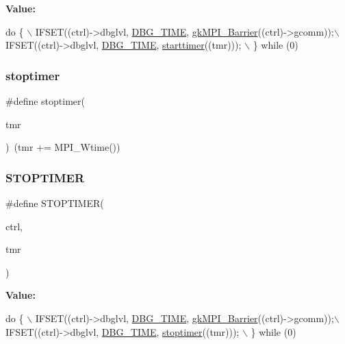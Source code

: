 {\bfseries Value\+:}
\begin{DoxyCode}
\textcolor{keywordflow}{do} \{ \(\backslash\)
     IFSET((ctrl)->dbglvl, \hyperlink{a00894_ae69476d7e520ec253b24dd0f2305dfbc}{DBG\_TIME}, \hyperlink{a00960_a2e3dc0708c9b1ba0aa67b8138b878d00}{gkMPI\_Barrier}((ctrl)->gcomm));\(\backslash\)
     IFSET((ctrl)->dbglvl, \hyperlink{a00894_ae69476d7e520ec253b24dd0f2305dfbc}{DBG\_TIME}, \hyperlink{a00924_ae152c218f682104fbe90b42318765caf}{starttimer}((tmr))); \(\backslash\)
   \} \textcolor{keywordflow}{while} (0)
\end{DoxyCode}
\mbox{\label{a00924_a5201dfe38edd7089e892384c62267802}} 
\subsubsection{\texorpdfstring{stoptimer}{stoptimer}}
{\footnotesize\ttfamily \#define stoptimer(\begin{DoxyParamCaption}\item[{}]{tmr }\end{DoxyParamCaption})~(tmr += M\+P\+I\+\_\+\+Wtime())}

\mbox{\label{a00924_ac283007da12d7cee4bc94d545f4700f5}} 
\subsubsection{\texorpdfstring{S\+T\+O\+P\+T\+I\+M\+ER}{STOPTIMER}}
{\footnotesize\ttfamily \#define S\+T\+O\+P\+T\+I\+M\+ER(\begin{DoxyParamCaption}\item[{}]{ctrl,  }\item[{}]{tmr }\end{DoxyParamCaption})}

{\bfseries Value\+:}
\begin{DoxyCode}
\textcolor{keywordflow}{do} \{ \(\backslash\)
     IFSET((ctrl)->dbglvl, \hyperlink{a00894_ae69476d7e520ec253b24dd0f2305dfbc}{DBG\_TIME}, \hyperlink{a00960_a2e3dc0708c9b1ba0aa67b8138b878d00}{gkMPI\_Barrier}((ctrl)->gcomm));\(\backslash\)
     IFSET((ctrl)->dbglvl, \hyperlink{a00894_ae69476d7e520ec253b24dd0f2305dfbc}{DBG\_TIME}, \hyperlink{a00924_a5201dfe38edd7089e892384c62267802}{stoptimer}((tmr))); \(\backslash\)
   \} \textcolor{keywordflow}{while} (0)
\end{DoxyCode}
\mbox{\label{a00924_a213331e15c4859c51ae85a9f45dc4403}} 
